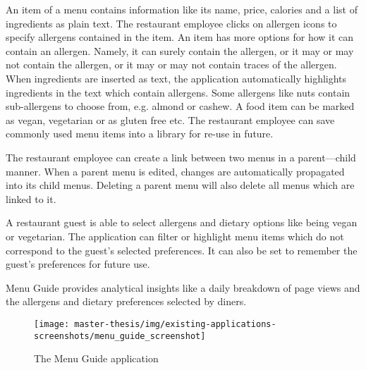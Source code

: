   An item of a menu contains information like its name, price, calories and a list of ingredients as plain text.
  The restaurant employee clicks on allergen icons to specify allergens contained in the item.
  An item has more options for how it can contain an allergen. 
  Namely, it can surely contain the allergen, or it may or may not contain the allergen, or it may or may not contain traces of the allergen.
  When ingredients are inserted as text, the application automatically highlights ingredients in the text which contain allergens.
  Some allergens like nuts contain sub-allergens to choose from, e.g. almond or cashew.
  A food item can be marked as vegan, vegetarian or as gluten free etc.
  The restaurant employee can save commonly used menu items into a library for re-use in future. 

  The restaurant employee can create a link between two menus in a parent---child manner.
  When a parent menu is edited, changes are automatically propagated into its child menus.
  Deleting a parent menu will also delete all menus which are linked to it.

  A restaurant guest is able to select allergens and dietary options like being vegan or vegetarian.
  The application can filter or highlight menu items which do not correspond to the guest's selected preferences.
  It can also be set to remember the guest's preferences for future use.

  Menu Guide provides analytical insights like a daily breakdown of page views and the allergens and dietary preferences selected by diners.

  \begin{figure}[h]
    \centering
    \texttt{[image: master-thesis/img/existing-applications-screenshots/menu\_guide\_screenshot]}
    \caption{The Menu Guide application}
  \end{figure}


